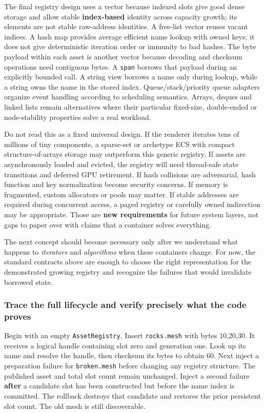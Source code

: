 The final registry design uses a vector because indexed slots give good dense storage and allow stable \textbf{index-based} identity across capacity growth; its elements are not stable raw-address identities. A free-list vector reuses vacant indices. A hash map provides average efficient name lookup with owned keys; it does not give deterministic iteration order or immunity to bad hashes. The byte payload within each asset is another vector because decoding and checksum operations need contiguous bytes. A \texttt{span} borrows that payload during an explicitly bounded call. A string view borrows a name only during lookup, while a string owns the name in the stored index. Queue/stack/priority queue adapters organize event handling according to scheduling semantics. Arrays, deques and linked lists remain alternatives where their particular fixed-size, double-ended or node-stability properties solve a real workload.

Do not read this as a fixed universal design. If the renderer iterates tens of millions of tiny components, a sparse-set or archetype ECS with compact structure-of-arrays storage may outperform this generic registry. If assets are asynchronously loaded and evicted, the registry will need thread-safe state transitions and deferred GPU retirement. If hash collisions are adversarial, hash function and key normalization become security concerns. If memory is fragmented, custom allocators or pools may matter. If stable addresses are required during concurrent access, a paged registry or carefully owned indirection may be appropriate. Those are \textbf{new requirements} for future system layers, not gaps to paper over with claims that a container solves everything.

The next concept should become necessary only after we understand what happens to \emph{iterators} and \emph{algorithms} when these containers change. For now, the standard contracts above are enough to choose the right representation for the demonstrated growing registry and recognize the failures that would invalidate borrowed state.

\subsubsection{Trace the full lifecycle and verify precisely what the code proves}\label{trace-the-full-lifecycle-and-verify-precisely-what-the-code-proves}

Begin with an empty \texttt{AssetRegistry}. Insert \texttt{rocks.mesh} with bytes 10,20,30. It receives a logical handle containing slot zero and generation one. Look up its name and resolve the handle, then checksum its bytes to obtain 60. Next inject a preparation failure for \texttt{broken.mesh} before changing any registry structure. The published asset and total slot count remain unchanged. Inject a second failure \textbf{after} a candidate slot has been constructed but before the name index is committed. The rollback destroys that candidate and restores the prior persistent slot count. The old mesh is still discoverable.

